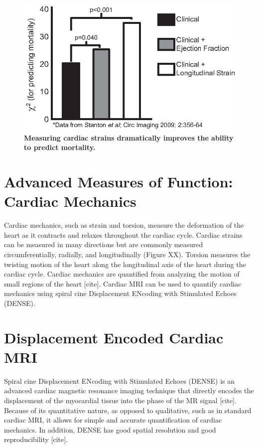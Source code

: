 	\begin{figure}
		\centering
		\includegraphics{figures/intro/Stanton}
		\caption[Measuring cardiac strains dramatically improves the ability to predict mortality]{\textbf{Measuring cardiac strains dramatically improves the ability to predict mortality.}}
		\label{fig:stanton}
	\end{figure}

\section{Advanced Measures of Function: Cardiac Mechanics}
 	Cardiac mechanics, such as strain and torsion, measure the deformation of the heart as it contracts and relaxes throughout the cardiac cycle. Cardiac strains can be measured in many directions but are commonly measured circumferentially, radially, and longitudinally (Figure XX). Torsion measures the twisting motion of the heart along the longitudinal axis of the heart during the cardiac cycle. Cardiac mechanics are quantified from analyzing the motion of small regions of the heart [cite]. Cardiac MRI can be used to quantify cardiac mechanics using spiral cine Displacement ENcoding with Stimulated Echoes (DENSE).

\section{Displacement Encoded Cardiac MRI}
	Spiral cine Displacement ENcoding with Stimulated Echoes (DENSE) is an advanced cardiac magnetic resonance imaging technique that directly encodes the displacement of the myocardial tissue into the phase of the MR signal [cite]. Because of its quantitative nature, as opposed to qualitative, such as in standard cardiac MRI, it allows for simple and accurate quantification of cardiac mechanics. In addition, DENSE has good spatial resolution and good reproducibility [cite].

